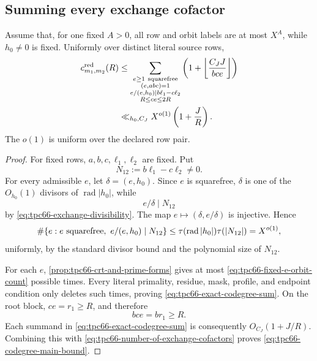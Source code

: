 \subsection{Summing every exchange cofactor}

\begin{theorem}
\label{thm:tpc66-divisor-thin-pair-codegree}
Assume that, for one fixed \(A>0\), all row and orbit labels are at most
\(X^A\), while \(h_0\ne0\) is fixed.  Uniformly over distinct literal
source rows,
\begin{align}
 c^{\mathrm{red}}_{m_1,m_2}(R)
 &\le
 \sum_{\substack{e\ge1\ {\rm squarefree}\\
          (e,abc)=1\\
          e/(e,h_0)\mid b\ell_1-c\ell_2\\
          R\le ce\le2R}}
 \left(
 1+\left\lfloor\frac{C_JJ}{bce}\right\rfloor
 \right)
 \label{eq:tpc66-exact-codegree-sum}\\
 &\ll_{h_0,C_J}
 X^{o(1)}
 \left(1+\frac JR\right).
 \label{eq:tpc66-codegree-main-bound}
\end{align}
The \(o(1)\) is uniform over the declared row pair.
\end{theorem}

\begin{proof}
For fixed rows, \(a,b,c,\ell_1,\ell_2\) are fixed.  Put
\[
 N_{12}:=b\ell_1-c\ell_2\ne0.
 \]
For every admissible \(e\), let \(\delta=(e,h_0)\).  Since \(e\) is
squarefree, \(\delta\) is one of the \(O_{h_0}(1)\) divisors of
\(\operatorname{rad}|h_0|\), while
\[
 e/\delta\mid N_{12}
 \]
by \eqref{eq:tpc66-exchange-divisibility}.  The map
\(e\mapsto(\delta,e/\delta)\) is injective.  Hence
\begin{equation}
 \#\{e:e\ {\rm squarefree},\ e/(e,h_0)\mid N_{12}\}
 \le
 \tau(\operatorname{rad}|h_0|)\tau(|N_{12}|)
 =X^{o(1)},
 \label{eq:tpc66-number-of-exchange-cofactors}
\end{equation}
uniformly, by the standard divisor bound and the polynomial size of
\(N_{12}\).

For each \(e\), \cref{prop:tpc66-crt-and-prime-forms} gives at most
\eqref{eq:tpc66-fixed-e-orbit-count} possible times.  Every literal
primality, residue, mask, profile, and endpoint condition only deletes
such times, proving \eqref{eq:tpc66-exact-codegree-sum}.  On the root
block, \(ce=r_1\ge R\), and therefore
\[
 bce=br_1\ge R.
 \]
Each summand in \eqref{eq:tpc66-exact-codegree-sum} is consequently
\(O_{C_J}(1+J/R)\).  Combining this with
\eqref{eq:tpc66-number-of-exchange-cofactors} proves
\eqref{eq:tpc66-codegree-main-bound}.
\end{proof}

